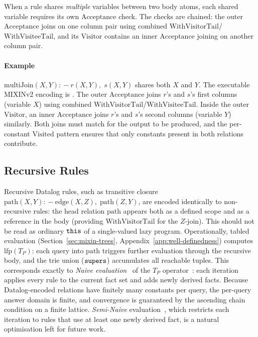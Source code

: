 When a rule shares \emph{multiple} variables between two
body atoms, each shared variable requires its own
$\mathrm{Acceptance}$ check.
The checks are chained: the outer $\mathrm{Acceptance}$
joins on one column pair using combined
$\mathrm{WithVisitorTail}$/$\mathrm{WithVisiteeTail}$, and
its $\mathrm{Visitor}$ contains an inner $\mathrm{Acceptance}$
joining on another column pair.

\paragraph{Example}
$\mathrm{multiJoin}(X, Y) \mathrel{{:}\!{-}} r(X, Y),\; s(X, Y)$
shares both $X$ and $Y$.
The executable MIXINv2 encoding is
.
The outer $\mathrm{Acceptance}$ joins $r$'s and $s$'s first
columns (variable $X$) using combined
$\mathrm{WithVisitorTail}$/$\mathrm{WithVisiteeTail}$.
Inside the outer $\mathrm{Visitor}$, an inner
$\mathrm{Acceptance}$ joins $r$'s and $s$'s second columns
(variable $Y$) similarly.
Both joins must match for the output to be produced, and
the per-constant $\mathrm{Visited}$ pattern ensures that
only constants present in both relations contribute.

\subsection{Recursive Rules}
\label{sec:recursive-rules}

Recursive Datalog rules, such as transitive closure
$\mathrm{path}(X, Y) \mathrel{{:}\!{-}} \mathrm{edge}(X, Z),\; \mathrm{path}(Z, Y)$,
are encoded identically to non-recursive rules: the
head relation $\mathrm{path}$ appears both as a defined scope
and as a reference in the body (providing
$\mathrm{WithVisitorTail}$ for the $Z$-join).
This should not be read as ordinary $\mathtt{this}$ of a
single-valued lazy program.
Operationally, tabled evaluation
(Section~\ref{sec:mixin-trees},
Appendix~\ref{app:well-definedness})
computes $\mathrm{lfp}(T_P)$: each query into
$\mathrm{path}$ triggers further evaluation through
the recursive body, and the trie union ($\mathtt{supers}$)
accumulates all reachable tuples.
This corresponds exactly to \emph{Naive
evaluation}~\cite{bancilhon1986-recursive-query-strategies} of the
$T_P$
operator~\cite{vanemden1976-predicate-logic-semantics}:
each iteration applies every rule to the current
fact set and adds newly derived facts.
Because Datalog-encoded relations have finitely many
constants per query, the per-query answer domain is
finite, and convergence is guaranteed by the ascending
chain condition on a finite lattice.
\emph{Semi-Naive} evaluation~\cite{bancilhon1986-recursive-query-strategies},
which restricts each iteration to rules that use at
least one newly derived fact, is a natural
optimisation left for future work.

